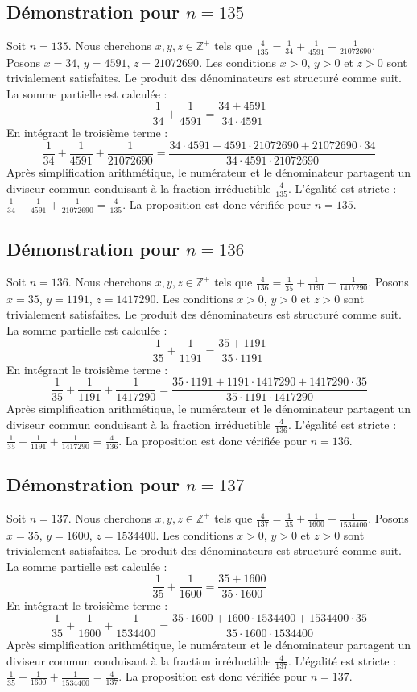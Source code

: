 \documentclass[11pt,a4paper]{article}
\begin{document}
\subsection{Démonstration pour $n = 135$}
Soit $n = 135$. Nous cherchons $x, y, z \in \mathbb{Z}^{+}$ tels que $\frac{4}{135} = \frac{1}{34} + \frac{1}{4591} + \frac{1}{21072690}$.
Posons $x = 34$, $y = 4591$, $z = 21072690$.
Les conditions $x > 0$, $y > 0$ et $z > 0$ sont trivialement satisfaites.
Le produit des dénominateurs est structuré comme suit. La somme partielle est calculée :
$$ \frac{1}{34} + \frac{1}{4591} = \frac{34+4591}{34 \cdot 4591} $$
En intégrant le troisième terme :
$$ \frac{1}{34} + \frac{1}{4591} + \frac{1}{21072690} = \frac{34 \cdot 4591 + 4591 \cdot 21072690 + 21072690 \cdot 34}{34 \cdot 4591 \cdot 21072690} $$
Après simplification arithmétique, le numérateur et le dénominateur partagent un diviseur commun conduisant à la fraction irréductible $\frac{4}{135}$.
L'égalité est stricte : $\frac{1}{34} + \frac{1}{4591} + \frac{1}{21072690} = \frac{4}{135}$.
La proposition est donc vérifiée pour $n = 135$.
\subsection{Démonstration pour $n = 136$}
Soit $n = 136$. Nous cherchons $x, y, z \in \mathbb{Z}^{+}$ tels que $\frac{4}{136} = \frac{1}{35} + \frac{1}{1191} + \frac{1}{1417290}$.
Posons $x = 35$, $y = 1191$, $z = 1417290$.
Les conditions $x > 0$, $y > 0$ et $z > 0$ sont trivialement satisfaites.
Le produit des dénominateurs est structuré comme suit. La somme partielle est calculée :
$$ \frac{1}{35} + \frac{1}{1191} = \frac{35+1191}{35 \cdot 1191} $$
En intégrant le troisième terme :
$$ \frac{1}{35} + \frac{1}{1191} + \frac{1}{1417290} = \frac{35 \cdot 1191 + 1191 \cdot 1417290 + 1417290 \cdot 35}{35 \cdot 1191 \cdot 1417290} $$
Après simplification arithmétique, le numérateur et le dénominateur partagent un diviseur commun conduisant à la fraction irréductible $\frac{4}{136}$.
L'égalité est stricte : $\frac{1}{35} + \frac{1}{1191} + \frac{1}{1417290} = \frac{4}{136}$.
La proposition est donc vérifiée pour $n = 136$.
\subsection{Démonstration pour $n = 137$}
Soit $n = 137$. Nous cherchons $x, y, z \in \mathbb{Z}^{+}$ tels que $\frac{4}{137} = \frac{1}{35} + \frac{1}{1600} + \frac{1}{1534400}$.
Posons $x = 35$, $y = 1600$, $z = 1534400$.
Les conditions $x > 0$, $y > 0$ et $z > 0$ sont trivialement satisfaites.
Le produit des dénominateurs est structuré comme suit. La somme partielle est calculée :
$$ \frac{1}{35} + \frac{1}{1600} = \frac{35+1600}{35 \cdot 1600} $$
En intégrant le troisième terme :
$$ \frac{1}{35} + \frac{1}{1600} + \frac{1}{1534400} = \frac{35 \cdot 1600 + 1600 \cdot 1534400 + 1534400 \cdot 35}{35 \cdot 1600 \cdot 1534400} $$
Après simplification arithmétique, le numérateur et le dénominateur partagent un diviseur commun conduisant à la fraction irréductible $\frac{4}{137}$.
L'égalité est stricte : $\frac{1}{35} + \frac{1}{1600} + \frac{1}{1534400} = \frac{4}{137}$.
La proposition est donc vérifiée pour $n = 137$.
\end{document}
